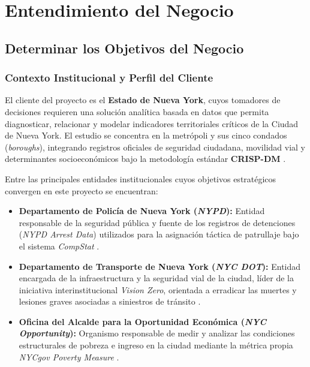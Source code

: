 \section{Entendimiento del Negocio}
\label{sec:entendimiento_negocio}

\subsection{Determinar los Objetivos del Negocio}

\subsubsection{Contexto Institucional y Perfil del Cliente}

El cliente del proyecto es el \textbf{Estado de Nueva York}, cuyos tomadores de decisiones requieren una solución analítica basada en datos que permita diagnosticar, relacionar y modelar indicadores territoriales críticos de la Ciudad de Nueva York. El estudio se concentra en la metrópoli y sus cinco condados (\textit{boroughs}), integrando registros oficiales de seguridad ciudadana, movilidad vial y determinantes socioeconómicos bajo la metodología estándar \textbf{CRISP-DM} \cite{crisp_dm_2000}.

Entre las principales entidades institucionales cuyos objetivos estratégicos convergen en este proyecto se encuentran:

\begin{itemize}
    \item \textbf{Departamento de Policía de Nueva York (\textit{NYPD}):} Entidad responsable de la seguridad pública y fuente de los registros de detenciones (\textit{NYPD Arrest Data}) utilizados para la asignación táctica de patrullaje bajo el sistema \textit{CompStat} \cite{nypd_compstat_2024}.
    
    \item \textbf{Departamento de Transporte de Nueva York (\textit{NYC DOT}):} Entidad encargada de la infraestructura y la seguridad vial de la ciudad, líder de la iniciativa interinstitucional \textit{Vision Zero}, orientada a erradicar las muertes y lesiones graves asociadas a siniestros de tránsito \cite{vision_zero_nyc_2023}.
    
    \item \textbf{Oficina del Alcalde para la Oportunidad Económica (\textit{NYC Opportunity}):} Organismo responsable de medir y analizar las condiciones estructurales de pobreza e ingreso en la ciudad mediante la métrica propia \textit{NYCgov Poverty Measure} \cite{nyc_opportunity_2024}.
\end{itemize}

